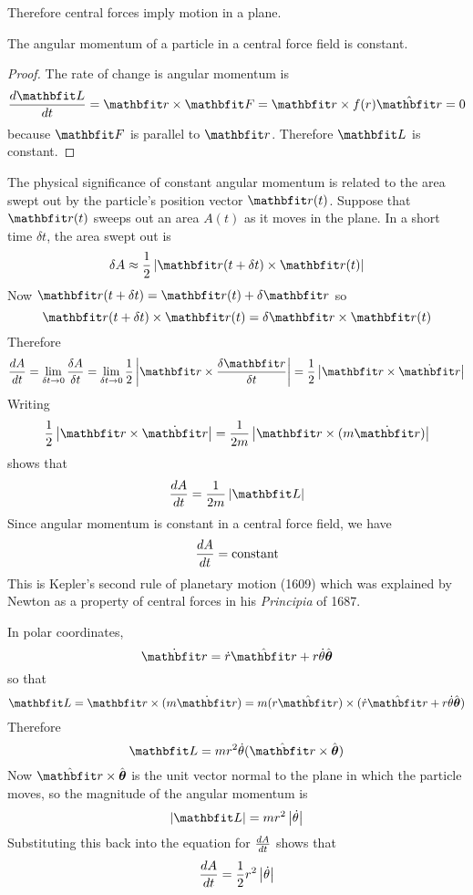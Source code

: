 Therefore central forces imply motion in a plane.

\begin{theorem}
The angular momentum of a particle in a central force field is constant.
\end{theorem}

\begin{proof}
The rate of change is angular momentum is
$$\der{\vect{L}}{t}=\vect{r}\times \vect{F}=\vect{r}\times f(r)\rvect=0$$
because $\vect{F}$ is parallel to $\vect{r}$.  Therefore $\vect{L}$ is
constant.
\end{proof}

The physical significance of constant angular momentum is related to the
area swept out by the particle's position vector $\vect{r}(t)$.  Suppose
that $\vect{r}(t)$ sweeps out an area $A(t)$ as it moves in the plane.  In a
short time $\delta t$, the area swept out is
$$\delta A\approx\frac{1}{2}\left|\vect{r}(t+\delta t)\times\vect{r}(t)\right|$$
Now $\vect{r}(t+\delta t)=\vect{r}(t)+\delta\vect{r}$ so
$$\vect{r}(t+\delta t)\times\vect{r}(t)=\delta\vect{r}\times\vect{r}(t)$$
Therefore
$$\der{A}{t}=\lim_{\delta t\to 0}\frac{\delta A}{\delta t}
=\lim_{\delta t\to 0}\frac{1}{2}\left|\vect{r}\times\frac{\delta\vect{r}}
{\delta t}\right|=\frac{1}{2}\left|\vect{r}\times\dot{\vect{r}}\right|$$
Writing
$$\frac{1}{2}\left|\vect{r}\times\dot{\vect{r}}\right|
=\frac{1}{2m}\left|\vect{r}\times(m\dot{\vect{r}})\right|$$
shows that
$$\der{A}{t}=\frac{1}{2m}\left|\vect{L}\right|$$
Since angular momentum is constant in a central force field, we have
$$\frac{dA}{dt}=\rm constant$$
This is Kepler's second rule of planetary motion (1609) which was explained
by Newton as a property of central forces in his {\em Principia} of 1687.

In polar coordinates, 
$$\dot{\vect{r}}=\dot{r}\rvect+r\dot{\theta}\tvect$$
so that
$$\vect{L}=\vect{r}\times (m\dot{\vect{r}})=m(r\rvect)\times
(\dot{r}\rvect+r\dot{\theta}\tvect)$$
Therefore 
$$\vect{L}=mr^2\dot{\theta}(\rvect\times\tvect)$$
Now $\rvect\times\tvect$ is the unit vector normal to the plane in which the
particle moves, so the magnitude of the angular momentum is
$$\left|\vect{L}\right|=mr^2\left|\dot{\theta}\right|$$
Substituting this back into the equation for $\frac{dA}{dt}$ shows that
$$\frac{dA}{dt}=\frac{1}{2}r^2\left|\dot{\theta}\right|$$

